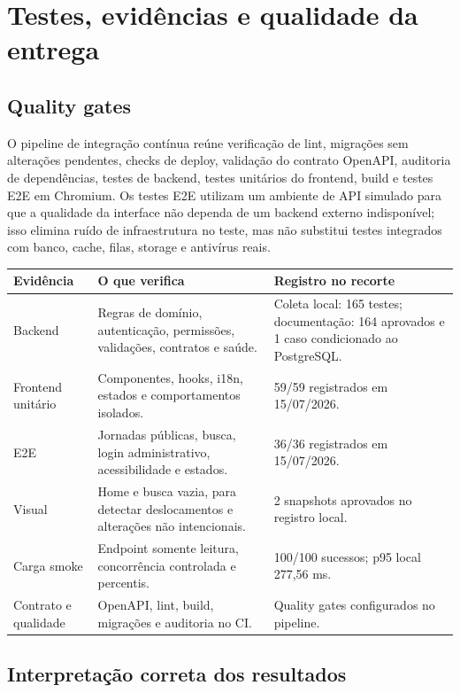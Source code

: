 \documentclass[11pt,a4paper]{article}
\begin{document}
\section{Testes, evidências e qualidade da entrega}

\subsection{Quality gates}

O pipeline de integração contínua reúne verificação de lint, migrações sem alterações pendentes, checks de deploy, validação do contrato OpenAPI, auditoria de dependências, testes de backend, testes unitários do frontend, build e testes E2E em Chromium. Os testes E2E utilizam um ambiente de API simulado para que a qualidade da interface não dependa de um backend externo indisponível; isso elimina ruído de infraestrutura no teste, mas não substitui testes integrados com banco, cache, filas, storage e antivírus reais.

\begin{longtable}{P{0.25\textwidth}P{0.38\textwidth}P{0.25\textwidth}}
\toprule
\textbf{Evidência} & \textbf{O que verifica} & \textbf{Registro no recorte} \\
\midrule
\endhead
\bottomrule
\endfoot
Backend & Regras de domínio, autenticação, permissões, validações, contratos e saúde. & Coleta local: 165 testes; documentação: 164 aprovados e 1 caso condicionado ao PostgreSQL. \\
Frontend unitário & Componentes, hooks, i18n, estados e comportamentos isolados. & 59/59 registrados em 15/07/2026. \\
E2E & Jornadas públicas, busca, login administrativo, acessibilidade e estados. & 36/36 registrados em 15/07/2026. \\
Visual & Home e busca vazia, para detectar deslocamentos e alterações não intencionais. & 2 snapshots aprovados no registro local. \\
Carga smoke & Endpoint somente leitura, concorrência controlada e percentis. & 100/100 sucessos; p95 local 277,56 ms. \\
Contrato e qualidade & OpenAPI, lint, build, migrações e auditoria no CI. & Quality gates configurados no pipeline. \\
\end{longtable}

\subsection{Interpretação correta dos resultados}
\end{document}
